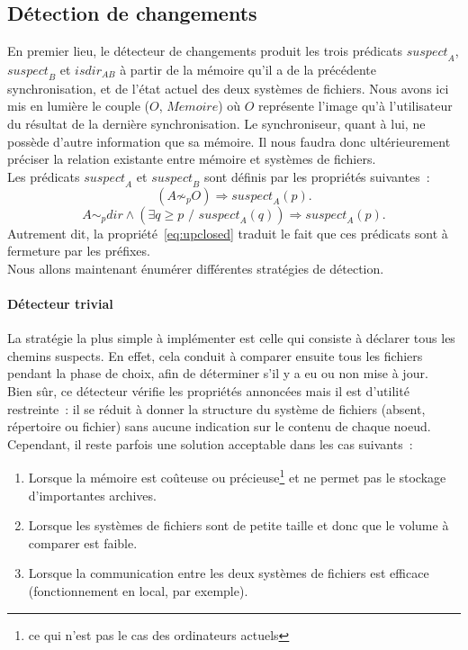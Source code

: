 \documentclass[11pt]{report}
\newcommand{\sus}[1]{\ensuremath{\mathit{suspect}_{#1}}}
\newcommand{\isdira}[2]{\ensuremath{\mathit{isdir}_{#1#2}}}
\begin{document}
\subsection{D\'etection de changements}
En premier lieu, le d\'etecteur de changements produit les trois pr\'edicats
 \sus{A}, \sus{B} et \isdira{A}{B} \`a partir de la m\'emoire qu'il a
 de la pr\'ec\'edente synchronisation, et de l'\'etat actuel des deux 
syst\`emes de fichiers. Nous avons ici mis en lumi\`ere le couple 
($O$, $\mathit{Memoire}$)
o\`u $O$ repr\'esente l'image qu'\`a l'utilisateur du r\'esultat de la 
derni\`ere synchronisation. Le synchroniseur, quant \`a lui, ne poss\`ede
d'autre information que sa m\'emoire. Il nous faudra donc ult\'erieurement
pr\'eciser la relation existante entre m\'emoire et syst\`emes de fichiers.\\
Les pr\'edicats \sus{A} et \sus{B} sont d\'efinis par les propri\'et\'es suivantes~:
\begin{equation}\label{eq:adiffo}
(A \not\sim_{p} O) \Rightarrow \sus{A}(p).
\end{equation}
\begin{equation}\label{eq:upclosed2}
A \sim_{p} dir \wedge ( \exists q \geq \mbox{$p$ / } \sus{A}(q)) 
\Rightarrow \sus{A}(p).\label{eq:upclosed}
\end{equation}
Autrement dit, la propri\'et\'e~\ref{eq:upclosed} traduit le fait que ces pr\'edicats sont \`a fermeture par les pr\'efixes.\\
Nous allons maintenant \'enum\'erer diff\'erentes strat\'egies de d\'etection.
\paragraph{D\'etecteur trivial\\}
La strat\'egie la plus simple \`a impl\'ementer est celle qui consiste \`a
d\'eclarer
 tous les chemins suspects. En effet, cela conduit \`a comparer ensuite tous les fichiers
pendant la phase de choix, afin de d\'eterminer s'il y a eu ou non mise \`a 
jour.\\
Bien s\^ur, ce d\'etecteur v\'erifie les propri\'et\'es annonc\'ees mais il est
d'utilit\'e restreinte~: il se r\'eduit \`a donner la structure du syst\`eme de
fichiers (absent, r\'epertoire ou fichier) sans aucune indication sur le 
contenu de chaque noeud.\\
Cependant, il reste parfois une solution acceptable dans les cas suivants~:
\begin{enumerate}
\item Lorsque la m\'emoire est co\^uteuse ou pr\'ecieuse\footnote{ce qui n'est pas le cas des 
ordinateurs actuels} et ne permet pas le stockage d'importantes archives.
\item Lorsque les syst\`emes de fichiers sont de petite taille et donc que le 
volume \`a comparer est faible. 
\item Lorsque la communication entre les deux syst\`emes de fichiers est efficace
(fonctionnement en local, par exemple).
\end{enumerate}
\end{document}

